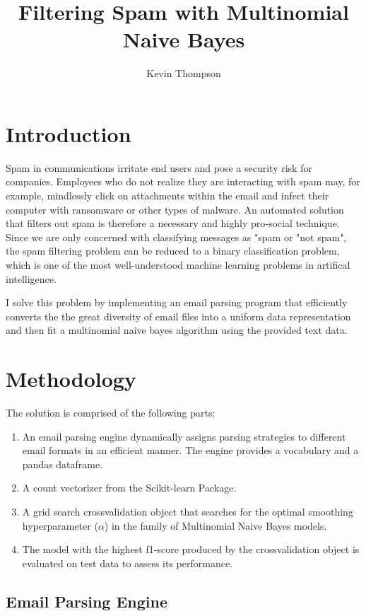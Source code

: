 \documentclass[10pt,a4paper]{article}
\author{Kevin Thompson}
\title{Filtering Spam with Multinomial Naive Bayes}
\begin{document}
\maketitle



\section{Introduction}
Spam in communications irritate end users and pose a security risk for companies. Employees who do not realize they are interacting with spam may, for example, mindlessly click on attachments within the email and infect their computer with ransomware or other types of malware. An automated solution that filters out spam is therefore a necessary and highly pro-social technique. Since we are only concerned with classifying messages as "spam or "not spam", the spam filtering problem can be reduced to a binary classification problem, which is one of the most well-understood machine learning problems in artifical intelligence.

I solve this problem by implementing an email parsing program that efficiently converts the the great diversity of email files into a uniform data representation and then fit a multinomial naive bayes algorithm using the provided text data.

\section{Methodology}
The solution is comprised of the following parts:
\begin{enumerate}
\item An email parsing engine dynamically assigns parsing strategies to different email formats in an efficient manner. The engine provides a vocabulary and a pandas dataframe.
\item A count vectorizer from the Scikit-learn Package.
\item A grid search crossvalidation object that searches for the optimal smoothing hyperparameter ($\alpha$) in the family of Multinomial Naive Bayes models.
\item The model with the highest f1-score produced by the crossvalidation object is evaluated on test data to assess its performance.
\end{enumerate}

\subsection{Email Parsing Engine}
\end{document}
